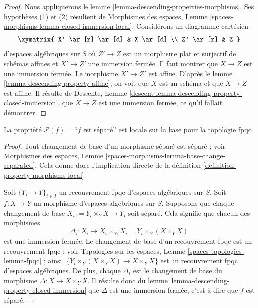 \begin{proof}
Nous appliquerons le
lemme \ref{lemma-descending-properties-morphisms}.
Ses hypothèses (1) et (2) résultent de
Morphismes des espaces,
Lemme \ref{spaces-morphisms-lemma-closed-immersion-local}.
Considérons un diagramme cartésien
$$
\xymatrix{
X' \ar[r] \ar[d] & X \ar[d] \\
Z' \ar[r] & Z
}
$$
d'espaces algébriques sur $S$
où $Z' \to Z$ est un morphisme plat et surjectif de schémas affines
et $X' \to Z'$ une immersion fermée. Il faut montrer que $X \to Z$
est une immersion fermée. Le morphisme $X' \to Z'$ est affine. D'après le
lemme \ref{lemma-descending-property-affine},
on voit que $X$ est un schéma et que $X \to Z$ est affine.
Il résulte de
Descente, Lemme \ref{descent-lemma-descending-property-closed-immersion},
que $X \to Z$ est une immersion fermée, ce qu'il fallait démontrer.
\end{proof}

\begin{lemma}
\label{lemma-descending-property-separated}
La propriété $\mathcal{P}(f) =$``$f$ est séparé''
est locale sur la base pour la topologie fpqc.
\end{lemma}

\begin{proof}
Tout changement de base d'un morphisme séparé est séparé ; voir
Morphismes des espaces,
Lemme \ref{spaces-morphisms-lemma-base-change-separated}.
Cela donne donc l'implication directe de la
définition \ref{definition-property-morphisms-local}.

\medskip\noindent
Soit $\{Y_i \to Y\}_{i \in I}$ un recouvrement fpqc d'espaces algébriques sur $S$.
Soit $f : X \to Y$ un morphisme d'espaces algébriques sur $S$.
Supposons que chaque changement de base $X_i := Y_i \times_Y X \to Y_i$ soit séparé.
Cela signifie que chacun des morphismes
$$
\Delta_i :
X_i
\longrightarrow
X_i \times_{Y_i} X_i = Y_i \times_Y (X \times_Y X)
$$
est une immersion fermée. Le changement de base d'un recouvrement fpqc est un
recouvrement fpqc ; voir
Topologies sur les espaces, Lemme \ref{spaces-topologies-lemma-fpqc} ;
ainsi, $\{Y_i \times_Y (X \times_Y X) \to X \times_Y X\}$
est un recouvrement fpqc d'espaces algébriques. De plus, chaque
$\Delta_i$ est le changement de base du morphisme
$\Delta : X \to X \times_Y X$. Il résulte donc du
lemme \ref{lemma-descending-property-closed-immersion}
que $\Delta$ est une immersion fermée, c'est-à-dire que $f$ est séparé.
\end{proof}

